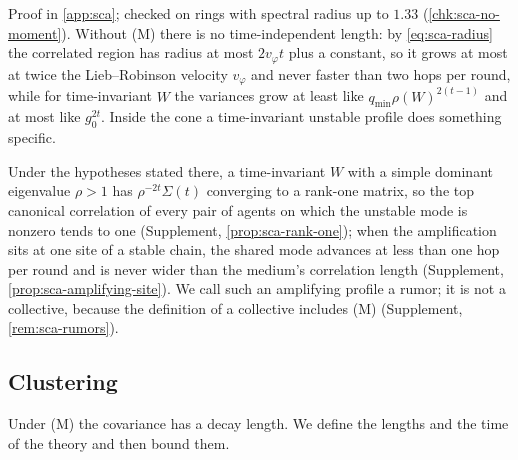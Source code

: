 Proof in \cref{app:sca}; checked on rings with spectral radius up to $1.33$ (\cref{chk:sca-no-moment}). Without \textup{(M)} there is no time-independent length: by \eqref{eq:sca-radius} the correlated region has radius at most $2v_\varphi t$ plus a constant, so it grows at most at twice the Lieb--Robinson velocity $v_\varphi$ and never faster than two hops per round, while for time-invariant $W$ the variances grow at least like $q_{\min}\rho(W)^{2(t-1)}$ and at most like $g_0^{2t}$. Inside the cone a time-invariant unstable profile does something specific.

Under the hypotheses stated there, a time-invariant $W$ with a simple dominant eigenvalue $\rho>1$ has $\rho^{-2t}\Sigma(t)$ converging to a rank-one matrix, so the top canonical correlation of every pair of agents on which the unstable mode is nonzero tends to one (Supplement, \cref{prop:sca-rank-one}); when the amplification sits at one site of a stable chain, the shared mode advances at less than one hop per round and is never wider than the medium's correlation length (Supplement, \cref{prop:sca-amplifying-site}). We call such an amplifying profile a rumor; it is not a collective, because the definition of a collective includes \textup{(M)} (Supplement, \cref{rem:sca-rumors}).

\subsection{Clustering}\label{sec:sca-clustering}

Under \textup{(M)} the covariance has a decay length. We define the lengths and the time of the theory and then bound them.

